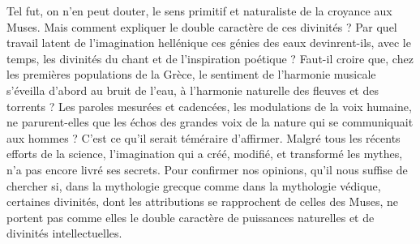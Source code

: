 \documentclass[landscape, a4paper, 11pt, oneside, polutonikogreek, french]{article}
\begin{document}
Tel fut, on n'en peut douter, le sens primitif et naturaliste de la croyance aux Muses. Mais comment expliquer le double caractère de ces divinités ? Par quel travail latent de l'imagination hellénique ces génies des eaux devinrent-ils, avec le temps, les divinités du chant et de l'inspiration poétique ? Faut-il croire que, chez les premières populations de la Grèce, le sentiment de l'harmonie musicale s'éveilla d'abord au bruit de l'eau, à l'harmonie naturelle des fleuves et des torrents ? Les paroles mesurées et cadencées, les modulations de la voix humaine, ne parurent-elles que les échos des grandes voix de la nature qui se communiquait aux hommes ? C'est ce qu'il serait téméraire d'affirmer. Malgré tous les récents efforts de la science, l'imagination qui a créé, modifié, et transformé les mythes, n'a pas encore livré ses secrets. Pour confirmer nos opinions, qu'il nous suffise de chercher si, dans la mythologie grecque comme dans la mythologie védique, certaines divinités, dont les attributions se rapprochent de celles des Muses, ne portent pas comme elles le double caractère de puissances naturelles et de divinités intellectuelles.
\end{document}
